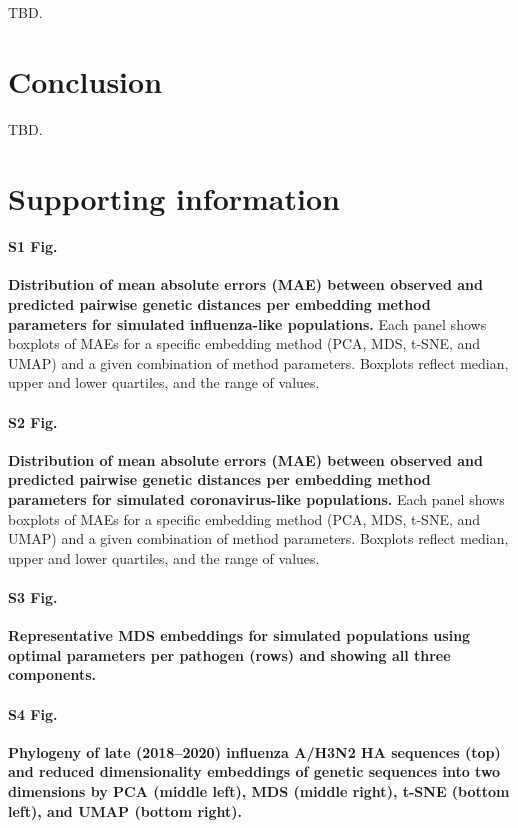 \documentclass[10pt,letterpaper]{article}
\begin{document}
TBD.

\section*{Conclusion}

TBD.

\section*{Supporting information}

\paragraph*{S1 Fig.}
\label{S1_Fig_simulated_flu_errors}
{\bf Distribution of mean absolute errors (MAE) between observed and predicted pairwise genetic distances per embedding method parameters for simulated influenza-like populations.} Each panel shows boxplots of MAEs for a specific embedding method (PCA, MDS, t-SNE, and UMAP) and a given combination of method parameters. Boxplots reflect median, upper and lower quartiles, and the range of values.

\paragraph*{S2 Fig.}
\label{S2_Fig_simulated_coronavirus_errors}
{\bf Distribution of mean absolute errors (MAE) between observed and predicted pairwise genetic distances per embedding method parameters for simulated coronavirus-like populations.} Each panel shows boxplots of MAEs for a specific embedding method (PCA, MDS, t-SNE, and UMAP) and a given combination of method parameters. Boxplots reflect median, upper and lower quartiles, and the range of values.

\paragraph*{S3 Fig.}
\label{S3_Fig_simulated_representative_mds_embeddings}
{\bf Representative MDS embeddings for simulated populations using optimal parameters per pathogen (rows) and showing all three components.}

\paragraph*{S4 Fig.}
\label{S4_Fig_late_flu_embeddings_by_clade}
{\bf Phylogeny of late (2018--2020) influenza A/H3N2 HA sequences (top) and reduced dimensionality embeddings of genetic sequences into two dimensions by PCA (middle left), MDS (middle right), t-SNE (bottom left), and UMAP (bottom right).}
\end{document}
